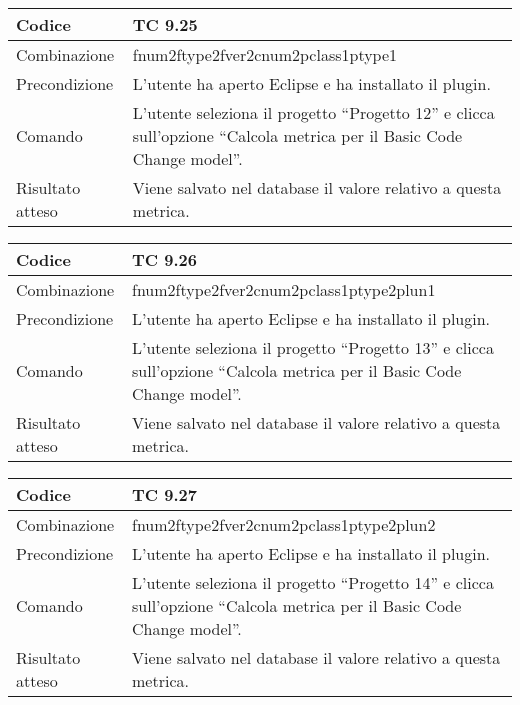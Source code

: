 \begin{table}[ht]
\begin{tabular}{|p{3cm}|p{9cm}|}
\hline
\cellcolor{lightgray}Codice				& TC 9.25								\\
\hline
\cellcolor{lightgray}Combinazione		& fnum2ftype2fver2cnum2pclass1ptype1									\\
\hline
\cellcolor{lightgray}Precondizione		& L'utente ha aperto Eclipse e ha installato il plugin.		\\
\hline
\cellcolor{lightgray}Comando			& L'utente seleziona il progetto ``Progetto 12''  e clicca sull'opzione ``Calcola metrica per il Basic Code Change model''.	\\
\hline
\cellcolor{lightgray}Risultato atteso	& Viene salvato nel database il valore relativo a questa metrica.\\
\hline
\end{tabular}
\end{table}

\begin{table}[ht]
\begin{tabular}{|p{3cm}|p{9cm}|}
\hline
\cellcolor{lightgray}Codice				& TC 9.26								\\
\hline
\cellcolor{lightgray}Combinazione		& fnum2ftype2fver2cnum2pclass1ptype2plun1									\\
\hline
\cellcolor{lightgray}Precondizione		& L'utente ha aperto Eclipse e ha installato il plugin.		\\
\hline
\cellcolor{lightgray}Comando			& L'utente seleziona il progetto ``Progetto 13''  e clicca sull'opzione ``Calcola metrica per il Basic Code Change model''.	\\
\hline
\cellcolor{lightgray}Risultato atteso	& Viene salvato nel database il valore relativo a questa metrica.\\
\hline
\end{tabular}
\end{table}

\begin{table}[ht]
\begin{tabular}{|p{3cm}|p{9cm}|}
\hline
\cellcolor{lightgray}Codice				& TC 9.27								\\
\hline
\cellcolor{lightgray}Combinazione		& fnum2ftype2fver2cnum2pclass1ptype2plun2									\\
\hline
\cellcolor{lightgray}Precondizione		& L'utente ha aperto Eclipse e ha installato il plugin.		\\
\hline
\cellcolor{lightgray}Comando			& L'utente seleziona il progetto ``Progetto 14''  e clicca sull'opzione ``Calcola metrica per il Basic Code Change model''.	\\
\hline
\cellcolor{lightgray}Risultato atteso	& Viene salvato nel database il valore relativo a questa metrica.\\
\hline
\end{tabular}
\end{table}

